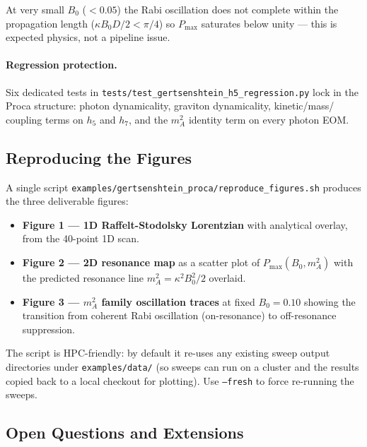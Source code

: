 At very small $B_0$ ($< 0.05$) the Rabi oscillation does not complete
within the propagation length ($\kappa B_0 D / 2 < \pi/4$) so $P_{\max}$
saturates below unity --- this is expected physics, not a pipeline issue.

\paragraph{Regression protection.} Six dedicated tests in
\texttt{tests/test\_gertsenshtein\_h5\_regression.py} lock in the Proca
structure: photon dynamicality, graviton dynamicality, kinetic/mass/
coupling terms on $h_5$ and $h_7$, and the $m_A^2$ identity term on
every photon EOM.

\subsection{Reproducing the Figures}
\label{subsec:proca-reproduce}

A single script \texttt{examples/gertsenshtein\_proca/reproduce\_figures.sh}
produces the three deliverable figures:

\begin{itemize}
  \item \textbf{Figure 1 --- 1D Raffelt-Stodolsky Lorentzian} with
    analytical overlay, from the 40-point 1D scan.
  \item \textbf{Figure 2 --- 2D resonance map} as a scatter plot of
    $P_{\max}(B_0, m_A^2)$ with the predicted resonance line $m_A^2 =
    \kappa^2 B_0^2 / 2$ overlaid.
  \item \textbf{Figure 3 --- $m_A^2$ family oscillation traces} at fixed
    $B_0 = 0.10$ showing the transition from coherent Rabi oscillation
    (on-resonance) to off-resonance suppression.
\end{itemize}

The script is HPC-friendly: by default it re-uses any existing sweep
output directories under \texttt{examples/data/} (so sweeps can run on
a cluster and the results copied back to a local checkout for plotting).
Use \texttt{--fresh} to force re-running the sweeps.

\subsection{Open Questions and Extensions}
\label{subsec:proca-extensions}

